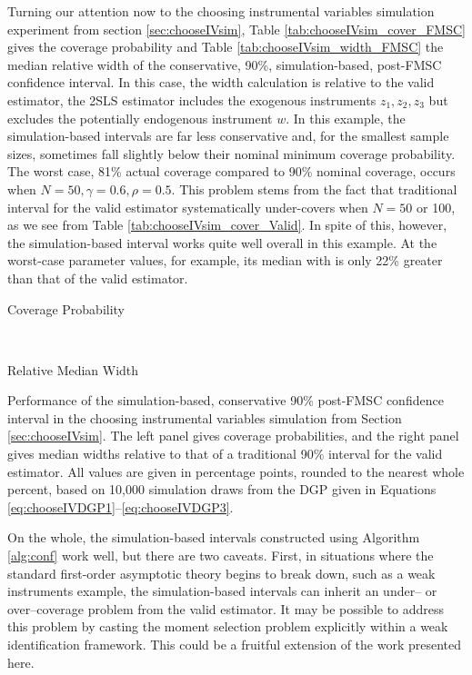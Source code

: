 Turning our attention now to the choosing instrumental variables simulation experiment from section \ref{sec:chooseIVsim}, Table \ref{tab:chooseIVsim_cover_FMSC} gives the coverage probability and Table \ref{tab:chooseIVsim_width_FMSC} the median relative width of the conservative, 90\%, simulation-based, post-FMSC confidence interval.
In this case, the width calculation is relative to the valid estimator, the 2SLS estimator includes the exogenous instruments $z_1, z_2, z_3$ but excludes the potentially endogenous instrument $w$.
In this example, the simulation-based intervals are far less conservative and, for the smallest sample sizes, sometimes fall slightly below their nominal minimum coverage probability.
The worst case, 81\% actual coverage compared to 90\% nominal coverage, occurs when $N=50, \gamma = 0.6, \rho = 0.5$.
This problem stems from the fact that traditional interval for the valid estimator systematically under-covers when $N = 50$ or 100, as we see from Table \ref{tab:chooseIVsim_cover_Valid}.
In spite of this, however, the simulation-based interval works quite well overall in this example.
At the worst-case parameter values, for example, its median with is only 22\% greater than that of the valid estimator.

\begin{table}[h]
\footnotesize
\centering
	\begin{subtable}{0.48\textwidth}
		\caption{Coverage Probability}
		\label{tab:chooseIVsim_cover_FMSC}
		
	\end{subtable}	
	~
	\begin{subtable}{0.48\textwidth}
		\caption{Relative Median Width}
		\label{tab:chooseIVsim_width_FMSC}
		
	\end{subtable}
\caption{Performance of the simulation-based, conservative 90\% post-FMSC confidence interval in the choosing instrumental variables simulation from Section \ref{sec:chooseIVsim}. The left panel gives coverage probabilities, and the right panel gives median widths relative to that of a traditional 90\% interval for the valid estimator. All values are given in percentage points, rounded to the nearest whole percent, based on 10,000 simulation draws from the DGP given in Equations \ref{eq:chooseIVDGP1}--\ref{eq:chooseIVDGP3}.}
\end{table}

On the whole, the simulation-based intervals constructed using Algorithm \ref{alg:conf} work well, but there are two caveats.
First, in situations where the standard first-order asymptotic theory begins to break down, such as a weak instruments example, the simulation-based intervals can inherit an under-- or over--coverage problem from the valid estimator.
It may be possible to address this problem by casting the moment selection problem explicitly within a weak identification framework.
This could be a fruitful extension of the work presented here.

